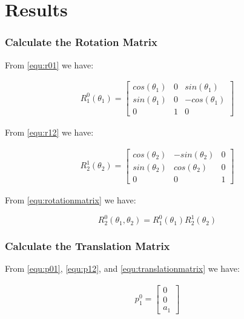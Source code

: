 \documentclass[a4paper, titlepage]{article}
\begin{document}
\section{Results}
\subsubsection{Calculate the Rotation Matrix}

From \ref{equ:r01} we have:

\begin{equation}
\begin{split}
R^0_{1}(\theta_{1}) = 
\begin{bmatrix}
cos(\theta_{1}) & 0 & sin(\theta_{1})  \\ 
sin(\theta_{1}) & 0 & -cos(\theta_{1})  \\ 
0 & 1 & 0
\end{bmatrix}
\end{split}
\end{equation}

From \ref{equ:r12} we have:


\begin{equation}
\begin{split}
R^1_{2}(\theta_{2}) = 
\begin{bmatrix}
cos(\theta_{2}) & -sin(\theta_{2}) & 0 \\ 
sin(\theta_{2}) & cos(\theta_{2}) & 0 \\ 
0 & 0 & 1
\end{bmatrix}
\end{split}
\end{equation}

From \ref{equ:rotationmatrix} we have:

\begin{equation}
R^0_{2}(\theta_{1},\theta_{2}) = R^0_{1}(\theta_{1})R^1_{2}(\theta_{2})
\end{equation}


\subsubsection{Calculate the Translation Matrix}

From \ref{equ:p01}, \ref{equ:p12}, and \ref{equ:translationmatrix} we have:

\begin{equation}
\begin{split}
p^0_{1} = 
\begin{bmatrix}
0 \\ 
0 \\ 
a_{1}
\end{bmatrix}
\end{split}
\end{equation}
\end{document}
